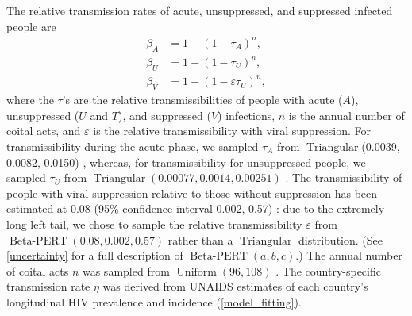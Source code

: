 \documentclass{article}
\DeclareMathOperator{\Uniform}{Uniform}
\DeclareMathOperator{\Triangular}{Triangular}
\DeclareMathOperator{\BetaPERT}{Beta-PERT}
\begin{document}
The relative transmission rates of acute, unsuppressed, and suppressed
infected people are
\begin{equation}
  \label{betas}
  \begin{split}
    \beta_A &= 1 - (1 - \tau_A)^n,
    \\
    \beta_U &= 1 - (1 - \tau_U)^n,
    \\
    \beta_V &= 1 - (1 - \varepsilon \tau_U)^n,
  \end{split}
\end{equation}
where the $\tau$'s are the relative transmissibilities of people with
acute ($A$), unsuppressed ($U$ and $T$), and suppressed ($V$)
infections, $n$ is the annual number of coital acts, and $\varepsilon$
is the relative transmissibility with viral suppression.  For
transmissibility during the acute phase, we sampled $\tau_A$ from
$\Triangular$(0.0039, 0.0082, 0.0150)
\autocite{Wawer2005-us, Skarbinski2015-ni}, whereas, for transmissibility
for unsuppressed people, we sampled $\tau_U$ from
$\Triangular(0.00077, 0.0014, 0.00251)$ \autocite{Hughes2012-so}.  The
transmissibility of people with viral suppression relative to those
without suppression has been estimated at 0.08 (95\% confidence
interval 0.002, 0.57) \autocite{Donnell2010-xo}: due to the extremely long
left tail, we chose to sample the relative transmissibility
$\varepsilon$ from $\BetaPERT(0.08, 0.002, 0.57)$ rather than a
$\Triangular$ distribution.  (See \autoref{uncertainty} for a full
description of $\BetaPERT(a, b, c)$.)  The annual number of coital
acts $n$ was sampled from $\Uniform(96, 108)$
\autocite{Wawer2005-us, Abdool_Karim2010-cm}.  The country-specific
transmission rate $\eta$ was derived from UNAIDS estimates of each
country's longitudinal HIV prevalence and incidence
(\autoref{model_fitting}).
\end{document}
